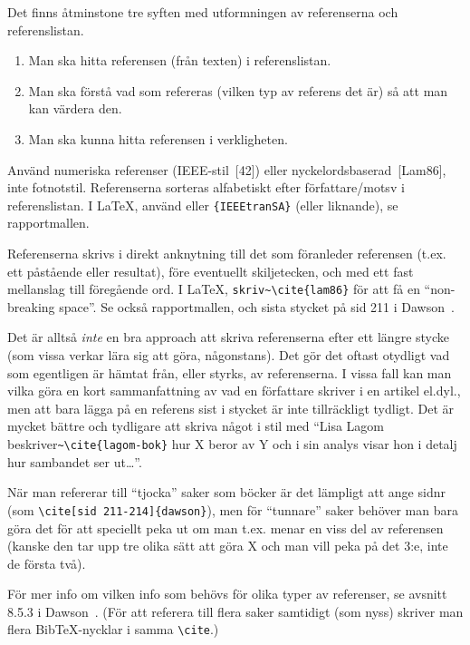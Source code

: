 \documentclass[swedish, a4paper,12pt]{article}
\begin{document}
Det finns åtminstone tre syften med utformningen av referenserna och referenslistan.
\begin{enumerate}
\item Man ska hitta referensen (från texten) i referenslistan.
\item Man ska förstå vad som refereras (vilken typ av referens det är) så att man kan värdera den.
\item Man ska kunna hitta referensen i verkligheten.
\end{enumerate}

Använd numeriska referenser (IEEE-stil~[42]) eller nyckelordsbaserad~[Lam86], inte fotnotstil. Referenserna sorteras alfabetiskt efter författare/motsv i referenslistan. I LaTeX, använd \verb|| eller \verb|{IEEEtranSA}| (eller liknande), se rapportmallen.

Referenserna skrivs i direkt anknytning till det som föranleder referensen (t.ex. ett påstående eller resultat), före eventuellt skiljetecken, och med ett fast mellanslag till föregående ord. I LaTeX, \verb|skriv~\cite{lam86}| för att få en ``non-breaking space''. Se också rapportmallen, och sista stycket på sid 211 i Dawson~\cite{dawson:projects-in-computing}.

Det är alltså \emph{inte} en bra approach att skriva referenserna efter ett längre stycke (som vissa verkar lära sig att göra, någonstans). Det gör det oftast otydligt vad som egentligen är hämtat från, eller styrks, av referenserna. I vissa fall kan man vilka göra en kort sammanfattning av vad en författare skriver i en artikel el.dyl., men att bara lägga på en referens sist i stycket är inte tillräckligt tydligt. Det är mycket bättre och tydligare att skriva något i stil med ``Lisa Lagom beskriver\verb|~\cite{lagom-bok}| hur X beror av Y och i sin analys visar hon i detalj hur sambandet ser ut\ldots''.

När man refererar till ``tjocka'' saker som böcker är det lämpligt att ange sidnr
(som \verb|\cite[sid 211-214]{dawson}|), men för ``tunnare'' saker behöver man bara göra det för att speciellt peka ut om man t.ex. menar en viss del av referensen (kanske den tar upp tre olika sätt att göra X och man vill peka på det 3:e, inte de första två).

För mer info om vilken info som behövs för olika typer av referenser, se avsnitt 8.5.3 i Dawson~\cite{dawson:projects-in-computing,dawson:projects-in-computing-old}. (För att referera till flera saker samtidigt (som nyss) skriver man flera BibTeX-nycklar i samma \verb|\cite|.)
\end{document}
